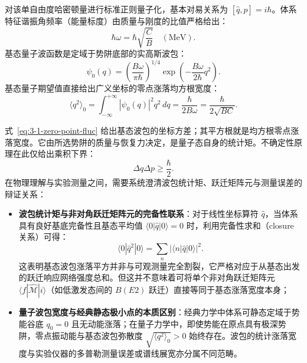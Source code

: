对该单自由度哈密顿量进行标准正则量子化，基本对易关系为 $[\hat{q}, \hat{p}] = i\hbar$。体系特征谐振角频率（能量标度）由质量与刚度的比值严格给出：
\begin{equation}\label{eq:3-1-oscillator-freq}
\hbar \omega = \hbar \sqrt{\frac{C}{B}} \quad (\mathrm{MeV}).
\end{equation}
基态量子波函数是定域于势阱底部的实高斯波包：
\begin{equation}\label{eq:3-1-ground-state-wf}
\psi_0(q) = \left( \frac{B \omega}{\pi \hbar} \right)^{1/4} \exp\left( -\frac{B \omega}{2\hbar} q^2 \right).
\end{equation}
基态量子期望值直接给出广义坐标的零点涨落均方根宽度：
\begin{equation}\label{eq:3-1-zero-point-fluc}
\langle q^2 \rangle_0 = \int_{-\infty}^{+\infty} |\psi_0(q)|^2 q^2 \, dq = \frac{\hbar}{2 B \omega} = \frac{\hbar}{2 \sqrt{B C}}.
\end{equation}

式~\eqref{eq:3-1-zero-point-fluc} 给出基态波包的坐标方差；其平方根就是均方根零点涨落宽度。它由所选势阱的质量与恢复力决定，是量子态自身的统计矩。不确定性原理在此仅给出乘积下界：
\begin{equation*}
\Delta q \Delta p \ge \frac{\hbar}{2} .
\end{equation*}
在物理理解与实验测量之间，需要系统澄清波包统计矩、跃迁矩阵元与测量误差的辩证关系：
\begin{itemize}
\item \textbf{波包统计矩与非对角跃迁矩阵元的完备性联系}：对于线性坐标算符 $\hat{q}$，当体系具有良好基底完备性且基态平均值 $\langle 0 | \hat{q} | 0 \rangle = 0$ 时，利用完备性求和（closure 关系）可得：
\begin{equation}\label{eq:3-1-closure-q2}
\langle 0 | \hat{q}^2 | 0 \rangle = \sum_n |\langle n | \hat{q} | 0 \rangle|^2.
\end{equation}
这表明基态波包涨落平方并非与可观测量完全割裂，它严格对应于从基态出发的跃迁响应网络强度总和。但这并不意味着可将单个非对角跃迁矩阵元 $\langle f | \hat{\mathcal{M}} | i \rangle$（如低激发态间的 $B(E2)$ 跃迁）直接等同于基态涨落宽度本身；
\item \textbf{量子波包宽度与经典静态极小点的本质区别}：经典力学中体系可静态定域于势能谷底 $q_0 = 0$ 且无动能涨落；在量子力学中，即使势能在原点具有极深势阱，零点振动能与基态波包弥散度 $\sqrt{\langle q^2 \rangle_0} > 0$ 始终存在。波包的统计涨落宽度与实验仪器的多普勒测量误差或谱线展宽亦分属不同范畴。
\end{itemize}

